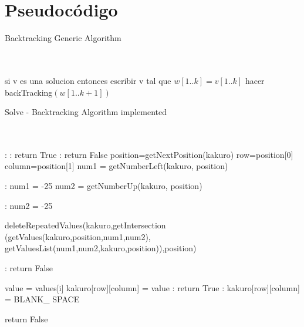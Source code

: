 \documentclass[conference]{IEEEtran}
\begin{document}
\section{Pseudoc\'odigo}
  \begin{algorithm}
   \caption{Backtracking  Generic Algorithm}
    \begin{algorithmic}[1]
      \\
		\\
        \State si v es una solucion entonces escribir v
        \State tal que $w[1..k] = v[1..k]$
        \State hacer backTracking$(w[1..k+1])$
        \EndFor
       \EndFunction
\end{algorithmic}
\end{algorithm}

  \begin{algorithm}
   \caption{Solve - Backtracking Algorithm implemented}
    \begin{algorithmic}[1]
      \\
		\\
		:
		    :
		        \State return True
		    \Else{}:
		        \State return False
		 \Else{}
		    \State position=getNextPosition(kakuro)
		    \State row=position[0]
		    \State column=position[1]
		    \State num1 = getNumberLeft(kakuro, position)
		    
		    :
		        \State num1 = -25
		    \EndIf
		    \State num2 = getNumberUp(kakuro, position)
		    
		    :
		        \State num2 = -25
		    \EndIf
		    
		    \State deleteRepeatedValues(kakuro,getIntersection
		    \State (getValues(kakuro,position,num1,num2),
		    \State getValuesList(num1,num2,kakuro,position)),position)
		    
		    :
		        \State return False
		    \EndIf
		    
		        \State value = values[i]
		        \State kakuro[row][column] = value
		        :
		            \State return True
		        \Else{}:
		            \State kakuro[row][column] = BLANK\_ SPACE
		    \EndFor
		    
	\State return False

       \EndFunction
\end{algorithmic}
\end{algorithm}
\end{document}
